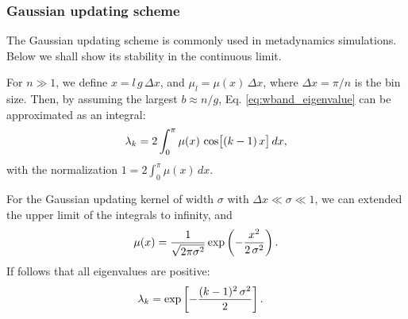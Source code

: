 \documentclass[reprint, floatfix]{revtex4-1}
\begin{document}
\subsubsection{Gaussian updating scheme}



The Gaussian updating scheme is commonly
used in metadynamics simulations.
%
Below we shall show its stability
in the continuous limit.



For $n \gg 1$,
we define
$x = l \, g \, \Delta x$,
and
$\mu_l = \mu(x) \, \Delta x$,
where
$\Delta x = \pi/n$
is the bin size.
%
Then,
by assuming the largest $b \approx n/g$,
Eq. \eqref{eq:wband_eigenvalue}
can be approximated as an integral:
%
\begin{equation}
  \lambda_k
  =
  2 \int_0^\pi
    \mu(x) \, \cos \bigl[ (k-1) \, x \bigr] \, dx,
\notag
\end{equation}
%
with the normalization
%
$
  1 = 2 \int_0^\pi \mu(x) \, dx.
$


For the Gaussian updating kernel of width $\sigma$
with $\Delta x \ll \sigma \ll 1$,
we can extended
the upper limit of the integrals
to infinity, and
%
\begin{equation}
  \mu(x)
  =
  \frac{            1            }
       { \sqrt{ 2 \pi \sigma^2 } }
  \exp\left(
        -\frac{       x^2     }
              { 2 \, \sigma^2 }
      \right)
  .
\notag
\end{equation}
%
%
If follows that all eigenvalues are positive:
%
\begin{align}
  \lambda_k
  &=
  \exp\left[
        -\frac{ (k - 1)^2 \, \sigma^2 }
              {           2           }
      \right]
  .
\notag
\end{align}
\end{document}
